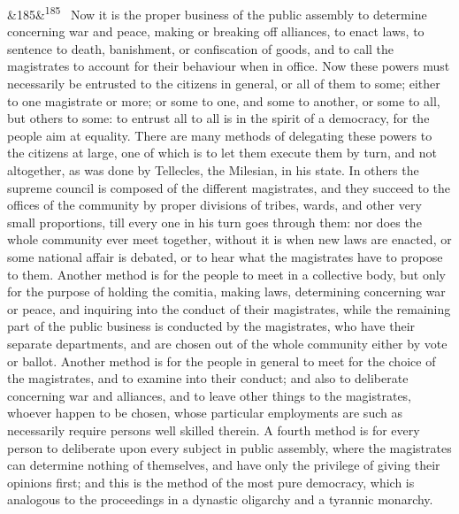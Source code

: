 \documentclass[12pt]{article}
\newcommand{\para}[1][]{\par\noindent\ifx&#1&\else\textsuperscript{\footnotesize #1}~\fi}
\begin{document}
\para[185] Now it is the proper business of the public assembly to determine concerning war and peace, making or breaking off alliances, to enact laws, to sentence to death, banishment, or confiscation of goods, and to call the magistrates to account for their behaviour when in office. Now these powers must necessarily be entrusted to the citizens in general, or all of them to some; either to one magistrate or more; or some to one, and some to another, or some to all, but others to some: to entrust all to all is in the spirit of a democracy, for the people aim at equality. There are many methods of delegating these powers to the citizens at large, one of which is to let them execute them by turn, and not altogether, as was done by Tellecles, the Milesian, in his state. In others the supreme council is composed of the different magistrates, and they succeed to the offices of the community by proper divisions of tribes, wards, and other very small proportions, till every one in his turn goes through them: nor does the whole community ever meet together, without it is when new laws are enacted, or some national affair is debated, or to hear what the magistrates have to propose to them. Another method is for the people to meet in a collective body, but only for the purpose of holding the comitia, making laws, determining concerning war or peace, and inquiring into the conduct of their magistrates, while the remaining part of the public business is conducted by the magistrates, who have their separate departments, and are chosen out of the whole community either by vote or ballot. Another method is for the people in general to meet for the choice of the magistrates, and to examine into their conduct; and also to deliberate concerning war and alliances, and to leave other things to the magistrates, whoever happen to be chosen, whose particular employments are such as necessarily require persons well skilled therein. A fourth method is for every person to deliberate upon every subject in public assembly, where the magistrates can determine nothing of themselves, and have only the privilege of giving their opinions first; and this is the method of the most pure democracy, which is analogous to the proceedings in a dynastic oligarchy and a tyrannic monarchy.
\end{document}
